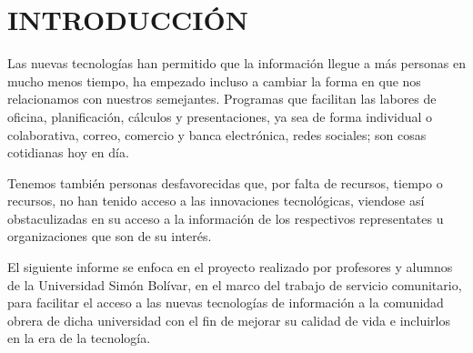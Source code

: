 	\chapter*{INTRODUCCIÓN}
    
    Las nuevas tecnologías han permitido que la información llegue a más personas en mucho menos tiempo, ha empezado incluso a cambiar la forma en que nos relacionamos con nuestros semejantes. Programas que facilitan las labores de oficina, planificación, cálculos y presentaciones, ya sea de forma individual o colaborativa, correo, comercio y banca electrónica, redes sociales; son cosas cotidianas hoy en día.
    
    Tenemos también personas desfavorecidas que, por falta de recursos, tiempo o recursos, no han tenido acceso a las innovaciones tecnológicas, viendose así obstaculizadas en su acceso a la información de los respectivos representates u organizaciones que son de su interés.
    
    El siguiente informe se enfoca en el proyecto realizado por profesores y alumnos de la Universidad Simón Bolívar, en el marco del trabajo de servicio comunitario, para facilitar el acceso a las nuevas tecnologías de información a la comunidad obrera de dicha universidad con el fin de mejorar su calidad de vida e incluirlos en la era de la tecnología.
    
	\pagebreak